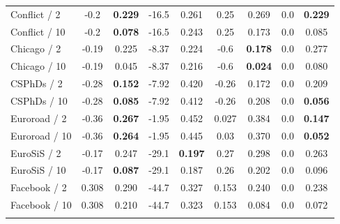 \documentclass{article} %
\begin{document}
\begin{table}[t]
\begin{center}
\begin{tabular}{lcccccc|cc}
Conflict / 2 &
-0.2 &	\textbf{0.229} &
-16.5 &	0.261 &
0.25 & 	0.269 &
0.0 & \textbf{0.229} \\
Conflict / 10 &
-0.2 & \textbf{0.078} &
-16.5 &	0.243 &
0.25 &	0.173 &
0.0 & 0.085  \\
Chicago / 2 &
-0.19 & 0.225 & 
-8.37 & 0.224 & 
-0.6 & \textbf{0.178} & 
0.0 & 0.277 \\
Chicago / 10 &
-0.19 & 0.045 & 
-8.37 & 0.216 & 
-0.6 & \textbf{0.024} & 
0.0 & 0.080  \\
CSPhDs / 2 &
-0.28 &	\textbf{0.152} &
-7.92 &	0.420 &
-0.26 & 0.172 &
0.0 & 0.209 \\
CSPhDs / 10 &
-0.28 &	\textbf{0.085} &
-7.92 &	0.412 &
-0.26 & 0.208 &
0.0 & \textbf{0.056} \\
Euroroad / 2 &
-0.36 &	\textbf{0.267} &
-1.95 &	0.452&
0.027 &	0.384&
0.0 & \textbf{0.147}\\
Euroroad / 10 &
-0.36 &	\textbf{0.264} &
-1.95 &	0.445 &
0.03 &	0.370 &
0.0 & \textbf{0.052}  \\
EuroSiS / 2 &
-0.17 & 0.247 & 
-29.1 & \textbf{0.197} & 
0.27 & 0.298 & 
0.0 & 0.263 \\
EuroSiS / 10 &
-0.17 & \textbf{0.087} & 
-29.1 & 0.187 & 
0.26 & 0.202 & 
0.0 & 0.096 \\
Facebook / 2 &
0.308 & 0.290 & 
-44.7 & 0.327 & 
0.153 & 0.240 & 
0.0 & 0.238  \\
Facebook / 10 &
0.308 & 0.210 &
-44.7 & 0.323 & 
0.153 & 0.084 & 
0.0 & 0.072 \\
\hline \\
\end{tabular}
\end{center}
\end{table}
\end{document}
